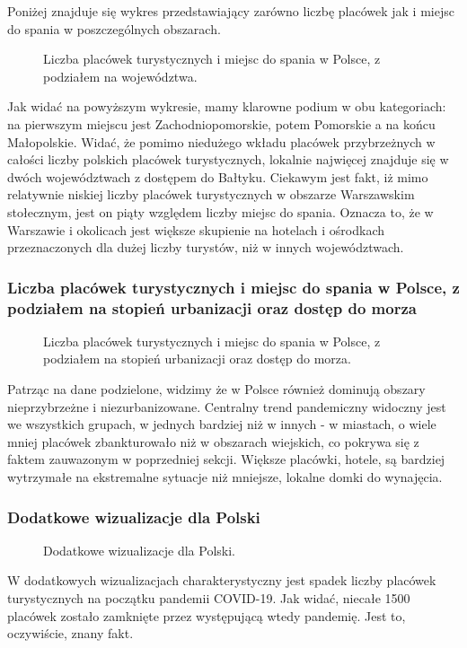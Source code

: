 \documentclass[12pt]{article}
\begin{document}
Poniżej znajduje się wykres przedstawiający zarówno liczbę placówek jak i miejsc do spania w poszczególnych obszarach.

\begin{figure}[H]
    
    \caption{Liczba placówek turystycznych i miejsc do spania w Polsce, z podziałem na województwa.}
\end{figure}
Jak widać na powyższym wykresie, mamy klarowne podium w obu kategoriach:
na pierwszym miejscu jest Zachodniopomorskie, potem Pomorskie a na końcu Małopolskie. Widać, że pomimo niedużego wkładu placówek przybrzeżnych w całości liczby polskich placówek 
turystycznych, lokalnie najwięcej znajduje się w dwóch województwach z dostępem do Bałtyku. 
Ciekawym jest fakt, iż mimo relatywnie niskiej liczby placówek turystycznych w obszarze Warszawskim stołecznym, jest on piąty względem liczby miejsc do spania. 
Oznacza to, że w Warszawie i okolicach jest większe skupienie na hotelach i ośrodkach przeznaczonych dla dużej liczby turystów, niż w innych województwach.


\subsubsection{Liczba placówek turystycznych i miejsc do spania w Polsce, z podziałem na stopień urbanizacji oraz dostęp do morza}
\begin{figure}[H]
    
    \caption{Liczba placówek turystycznych i miejsc do spania w Polsce, z podziałem na stopień urbanizacji oraz dostęp do morza.}
\end{figure}
Patrząc na dane podzielone, widzimy że w Polsce również dominują obszary nieprzybrzeżne i niezurbanizowane. Centralny trend pandemiczny widoczny jest we wszystkich 
grupach, w jednych bardziej niż w innych - w miastach, o wiele mniej placówek zbankturowało niż w obszarach wiejskich, co pokrywa się z faktem zauwazonym w poprzedniej sekcji.
Większe placówki, hotele, są bardziej wytrzymałe na ekstremalne sytuacje niż mniejsze, lokalne domki do wynajęcia.

\subsubsection{Dodatkowe wizualizacje dla Polski}
\begin{figure}[H]
    
    \caption{Dodatkowe wizualizacje dla Polski.}
\end{figure}
W dodatkowych wizualizacjach charakterystyczny jest spadek liczby placówek turystycznych na początku pandemii COVID-19. Jak widać, niecałe 1500 placówek zostało 
zamknięte przez występującą wtedy pandemię. Jest to, oczywiście, znany fakt.
\end{document}
